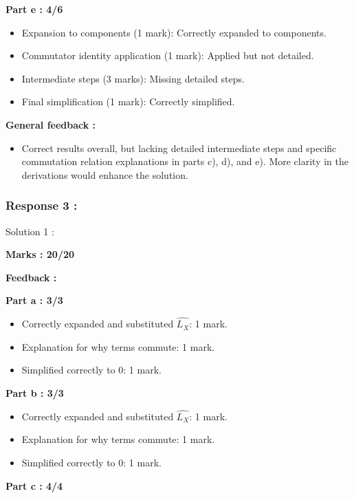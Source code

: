 \documentclass[a4paper,11pt]{article}
\begin{document}
\textbf{Part e : 4/6}

\begin{itemize}
    \item Expansion to components (1 mark): Correctly expanded to components.
    \item Commutator identity application (1 mark): Applied but not detailed.
    \item Intermediate steps (3 marks): Missing detailed steps.
    \item Final simplification (1 mark): Correctly simplified.
\end{itemize}


\textbf{General feedback :}

\begin{itemize}
    \item Correct results overall, but lacking detailed intermediate steps and specific commutation relation explanations in parts c), d), and e). More clarity in the derivations would enhance the solution.
\end{itemize}



\subsubsection*{Response 3 :}

Solution 1 :

\textbf{Marks : 20/20}

\textbf{Feedback :}

\textbf{Part a : 3/3}

\begin{itemize}
    \item Correctly expanded and substituted $\hat{L_X}$: 1 mark.
    \item Explanation for why terms commute: 1 mark.
    \item Simplified correctly to 0: 1 mark.
\end{itemize}


\textbf{Part b : 3/3}

\begin{itemize}
    \item Correctly expanded and substituted $\hat{L_X}$: 1 mark.
    \item Explanation for why terms commute: 1 mark.
    \item Simplified correctly to 0: 1 mark.
\end{itemize}


\textbf{Part c : 4/4}
\end{document}
